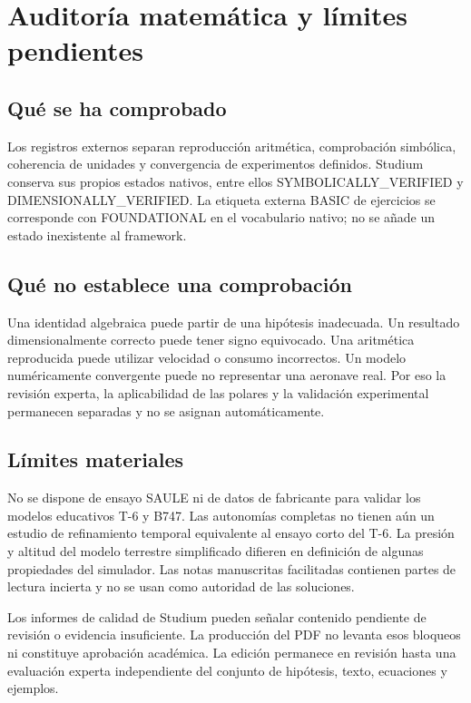\chapter{Auditoría matemática y límites pendientes}\label{app:audit}
\section{Qué se ha comprobado}
Los registros externos separan reproducción aritmética, comprobación simbólica, coherencia de unidades y convergencia de experimentos definidos. Studium conserva sus propios estados nativos, entre ellos SYMBOLICALLY\_VERIFIED y DIMENSIONALLY\_VERIFIED. La etiqueta externa BASIC de ejercicios se corresponde con FOUNDATIONAL en el vocabulario nativo; no se añade un estado inexistente al framework.



\section{Qué no establece una comprobación}
Una identidad algebraica puede partir de una hipótesis inadecuada. Un resultado dimensionalmente correcto puede tener signo equivocado. Una aritmética reproducida puede utilizar velocidad o consumo incorrectos. Un modelo numéricamente convergente puede no representar una aeronave real. Por eso la revisión experta, la aplicabilidad de las polares y la validación experimental permanecen separadas y no se asignan automáticamente.

\section{Límites materiales}
No se dispone de ensayo SAULE ni de datos de fabricante para validar los modelos educativos T-6 y B747. Las autonomías completas no tienen aún un estudio de refinamiento temporal equivalente al ensayo corto del T-6. La presión y altitud del modelo terrestre simplificado difieren en definición de algunas propiedades del simulador. Las notas manuscritas facilitadas contienen partes de lectura incierta y no se usan como autoridad de las soluciones.

Los informes de calidad de Studium pueden señalar contenido pendiente de revisión o evidencia insuficiente. La producción del PDF no levanta esos bloqueos ni constituye aprobación académica. La edición permanece en revisión hasta una evaluación experta independiente del conjunto de hipótesis, texto, ecuaciones y ejemplos.

